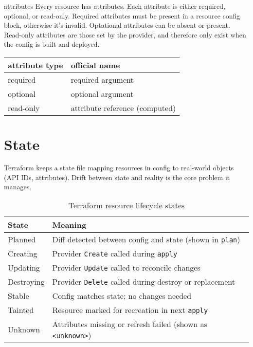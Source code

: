 \documentclass[openany, 12pt]{book}
\begin{document}
\begin{definition}{attributes}{}
	Every resource has attributes.  Each attribute is either required, optional,
	or read-only.  Required attributes must be present in a resource config
	block, otherwise it's invalid.  Optational attributes can be absent or
	present. Read-only attributes are those set by the provider, and therefore
	only exist when the config is built and deployed.

	\begin{center}
		\begin{tabular}{ll}
			\toprule
			attribute type & official name                  \\
			\midrule
			required       & required argument              \\
			optional       & optional argument              \\
			read-only      & attribute reference (computed) \\
			\bottomrule
		\end{tabular}
	\end{center}
\end{definition}

\chapter{State}
Terraform keeps a state file mapping resources in config to real-world objects
(API IDs, attributes). Drift between state and reality is the core problem it
manages.

\begin{table}[H]
	\centering
	\begin{tabular}{ll}
		\toprule
		\textbf{State} & \textbf{Meaning}                                                   \\
		\midrule
		Planned        & Diff detected between config and state (shown in \texttt{plan})    \\
		Creating       & Provider \texttt{Create} called during \texttt{apply}              \\
		Updating       & Provider \texttt{Update} called to reconcile changes               \\
		Destroying     & Provider \texttt{Delete} called during destroy or replacement      \\
		Stable         & Config matches state; no changes needed                            \\
		Tainted        & Resource marked for recreation in next \texttt{apply}              \\
		Unknown        & Attributes missing or refresh failed (shown as \texttt{<unknown>}) \\
		\bottomrule
	\end{tabular}
	\caption{Terraform resource lifecycle states}
\end{table}
\end{document}
